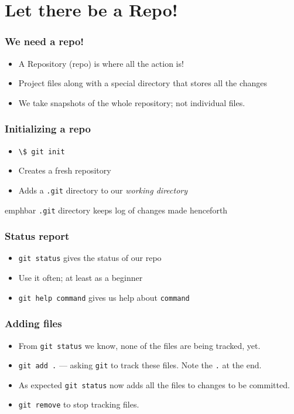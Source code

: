 \documentclass[14pt,compress]{beamer}
\newcommand{\emphbar}[1]
{\begin{beamercolorbox}[rounded=true]{emphbar}
      {#1}
 \end{beamercolorbox}
}
\newcommand{\typ}[1]{\lstinline{#1}}
\begin{document}
\section{Let there be a Repo!}
\begin{frame}
  \frametitle{We need a repo!}
  \begin{itemize}
  \item A Repository (repo) is where all the action is!
  \item Project files along with a special directory that stores all the
    changes
  \item We take snapshots of the whole repository; not individual
    files.
  \end{itemize}
\end{frame}

\begin{frame}
  \frametitle{Initializing a repo}
  \begin{itemize}
  \item \typ{\$ git init}
  \item Creates a fresh repository
  \item Adds a \typ{.git} directory to our \emph{working directory}
  \end{itemize}
  \emphbar{\typ{.git} directory keeps log of changes made henceforth}
\end{frame}

\begin{frame}
  \frametitle{Status report}
  \begin{itemize}
  \item \typ{git status} gives the status of our repo
  \item Use it often; at least as a beginner
  \item \typ{git help command} gives us help about \typ{command}
  \end{itemize}
\end{frame}

\begin{frame}
  \frametitle{Adding files}
  \begin{itemize}
  \item From \typ{git status} we know, none of the files are being
    tracked, yet.
  \item \typ{git add .} --- asking \typ{git} to track these files.
    Note the \typ{.} at the end.
  \item As expected \typ{git status} now adds all the files to changes
    to be committed.
  \item \typ{git remove} to stop tracking files.
  \end{itemize}
\end{frame}
\end{document}
